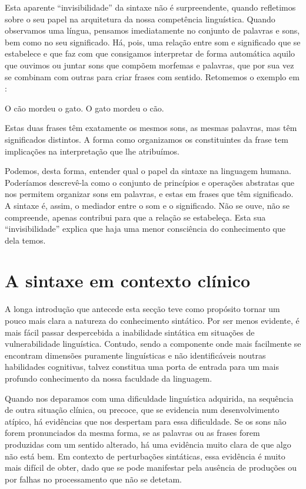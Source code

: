 \documentclass[output=paper,colorlinks,citecolor=brown,booklanguage=portuguese]{langscibook}
\begin{document}
Esta aparente “invisibilidade” da sintaxe não é surpreendente, quando refletimos sobre o seu papel na arquitetura da nossa competência linguística. Quando observamos uma língua, pensamos imediatamente no conjunto de palavras e sons, bem como no seu significado. Há, pois, uma relação entre som e significado que se estabelece e que faz com que consigamos interpretar de forma automática aquilo que ouvimos ou juntar sons que compõem morfemas e palavras, que por sua vez se combinam com outras para criar frases com sentido. Retomemos o exemplo em :

\begin{exe}
    \ea O cão mordeu o gato.
    \ex O gato mordeu o cão.
    \z
\end{exe}
    
Estas duas frases têm exatamente os mesmos sons, as mesmas palavras, mas têm significados distintos. A forma como organizamos os constituintes da frase tem implicações na interpretação que lhe atribuímos.

Podemos, desta forma, entender qual o papel da sintaxe na linguagem humana. Poderíamos descrevê-la como o conjunto de princípios e operações abstratas que nos permitem organizar sons em palavras, e estas em frases que têm significado. A sintaxe é, assim, o mediador entre o som e o significado. Não se ouve, não se compreende, apenas contribui para que a relação se estabeleça. Esta sua “invisibilidade” explica que haja uma menor consciência do conhecimento que dela temos.

\section{A sintaxe em contexto clínico}
A longa introdução que antecede esta secção teve como propósito tornar um pouco mais clara a natureza do conhecimento sintático. Por ser menos evidente, é mais fácil passar despercebida a inabilidade sintática em situações de vulnerabilidade linguística. Contudo, sendo a componente onde mais facilmente se encontram dimensões puramente linguísticas e não identificáveis noutras habilidades cognitivas, talvez constitua uma porta de entrada para um mais profundo conhecimento da nossa faculdade da linguagem.

Quando nos deparamos com uma dificuldade linguística adquirida, na sequência de outra situação clínica, ou precoce, que se evidencia num desenvolvimento atípico, há evidências que nos despertam para essa dificuldade. Se os sons não forem pronunciados da mesma forma, se as palavras ou as frases forem produzidas com um sentido alterado, há uma evidência muito clara de que algo não está bem. Em contexto de perturbações sintáticas, essa evidência é muito mais difícil de obter, dado que se pode manifestar pela ausência de produções ou por falhas no processamento que não se detetam.
\end{document}
